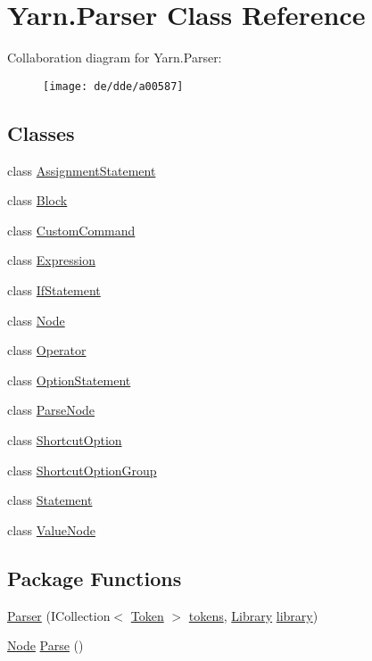 \hypertarget{a00121}{\section{Yarn.\-Parser Class Reference}
\label{a00121}
}


Collaboration diagram for Yarn.\-Parser\-:
\nopagebreak
\begin{figure}[H]
\begin{center}
\leavevmode
\texttt{[image: de/dde/a00587]}
\end{center}
\end{figure}
\subsection*{Classes}
\begin{DoxyCompactItemize}
\item 
class \hyperlink{a00018}{Assignment\-Statement}
\item 
class \hyperlink{a00022}{Block}
\item 
class \hyperlink{a00061}{Custom\-Command}
\item 
class \hyperlink{a00080}{Expression}
\item 
class \hyperlink{a00092}{If\-Statement}
\item 
class \hyperlink{a00110}{Node}
\item 
class \hyperlink{a00115}{Operator}
\item 
class \hyperlink{a00118}{Option\-Statement}
\item 
class \hyperlink{a00120}{Parse\-Node}
\item 
class \hyperlink{a00133}{Shortcut\-Option}
\item 
class \hyperlink{a00134}{Shortcut\-Option\-Group}
\item 
class \hyperlink{a00140}{Statement}
\item 
class \hyperlink{a00162}{Value\-Node}
\end{DoxyCompactItemize}
\subsection*{Package Functions}
\begin{DoxyCompactItemize}
\item 
\hyperlink{a00121_acd2714b911fb5e7c38f0e07a9dc1af58}{Parser} (I\-Collection$<$ \hyperlink{a00147}{Token} $>$ \hyperlink{a00121_a1a4de646937057988b59d2ff8035eae3}{tokens}, \hyperlink{a00101}{Library} \hyperlink{a00121_a1313951b09177a1c83b6cf035139197a}{library})
\item 
\hyperlink{a00110}{Node} \hyperlink{a00121_a811cc7226f4f4a2f3440cdb67ad14468}{Parse} ()
\end{DoxyCompactItemize}
